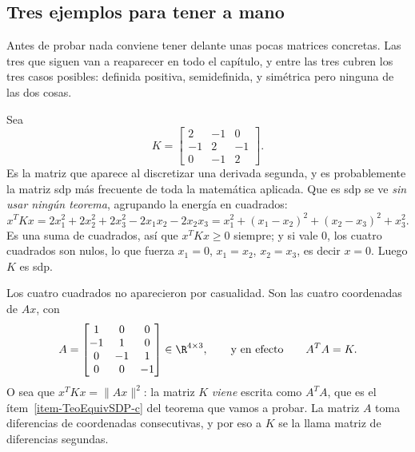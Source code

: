 \subsection{Tres ejemplos para tener a mano}
\label{sec:ejemplos-sdp}

Antes de probar nada conviene tener delante unas pocas matrices concretas. Las
tres que siguen van a reaparecer en todo el capítulo, y entre las tres cubren
los tres casos posibles: definida positiva, semidefinida, y simétrica pero
ninguna de las dos cosas.

\begin{example}\label{ej:K}
Sea
\[
K=\begin{bmatrix} 2 & -1 & 0\\ -1 & 2 & -1\\ 0 & -1 & 2\end{bmatrix} .
\]
Es la matriz que aparece al discretizar una derivada segunda, y es
probablemente la matriz sdp más frecuente de toda la matemática aplicada. Que
es sdp se ve \emph{sin usar ningún teorema}, agrupando la energía en cuadrados:
\[
x^TKx = 2x_1^2+2x_2^2+2x_3^2-2x_1x_2-2x_2x_3
= x_1^2 + (x_1-x_2)^2 + (x_2-x_3)^2 + x_3^2 .
\]
Es una suma de cuadrados, así que $x^TKx\ge0$ siempre; y si vale $0$, los
cuatro cuadrados son nulos, lo que fuerza $x_1=0$, $x_1=x_2$, $x_2=x_3$, es
decir $x=0$. Luego $K$ es sdp.

Los cuatro cuadrados no aparecieron por casualidad. Son las cuatro
coordenadas de $Ax$, con
\[
A=\begin{bmatrix} 1&0&0\\ -1&1&0\\ 0&-1&1\\ 0&0&-1\end{bmatrix}
\in\R^{4\times3},
\qquad\text{y en efecto}\qquad A^TA=K .
\]
O sea que $x^TKx=\|Ax\|^2$: la matriz $K$ \emph{viene} escrita como $A^TA$,
que es el ítem~\ref{item-TeoEquivSDP-c} del teorema que vamos a probar. La
matriz $A$ toma diferencias de coordenadas consecutivas, y por eso a $K$ se la
llama matriz de diferencias segundas.
\end{example}

